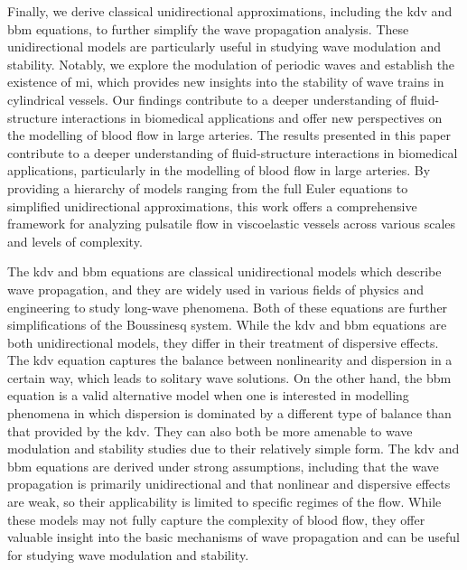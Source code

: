 \documentclass[alpha-refs, 12pt]{wiley-article}
\begin{document}
Finally, we derive classical unidirectional approximations, including the \acrfull{kdv} and \acrfull{bbm} equations, to further simplify the wave propagation analysis. These unidirectional models are particularly useful in studying wave modulation and stability. Notably, we explore the modulation of periodic waves and establish the existence of \acrfull{mi}, which provides new insights into the stability of wave trains in cylindrical vessels. Our findings contribute to a deeper understanding of fluid-structure interactions in biomedical applications and offer new perspectives on the modelling of blood flow in large arteries. The results presented in this paper contribute to a deeper understanding of fluid-structure interactions in biomedical applications, particularly in the modelling of blood flow in large arteries. By providing a hierarchy of models ranging from the full Euler equations to simplified unidirectional approximations, this work offers a comprehensive framework for analyzing pulsatile flow in viscoelastic vessels across various scales and levels of complexity.

The \acrfull{kdv} and \acrfull{bbm} equations are classical unidirectional models which describe wave propagation, and they are widely used in various fields of physics and engineering to study long-wave phenomena. Both of these equations are further simplifications of the Boussinesq system. While the \acrshort{kdv} and \acrshort{bbm} equations are both unidirectional models, they differ in their treatment of dispersive effects. The \acrshort{kdv} equation captures the balance between nonlinearity and dispersion in a certain way, which leads to solitary wave solutions. On the other hand, the \acrshort{bbm} equation is a valid alternative model when one is interested in modelling phenomena in which dispersion is dominated by a different type of balance than that provided by the \acrshort{kdv}. They can also both be more amenable to wave modulation and stability studies due to their relatively simple form. The \acrshort{kdv} and \acrshort{bbm} equations are derived under strong assumptions, including that the wave propagation is primarily unidirectional and that nonlinear and dispersive effects are weak, so their applicability is limited to specific regimes of the flow. While these models may not fully capture the complexity of blood flow, they offer valuable insight into the basic mechanisms of wave propagation and can be useful for studying wave modulation and stability.
\end{document}
